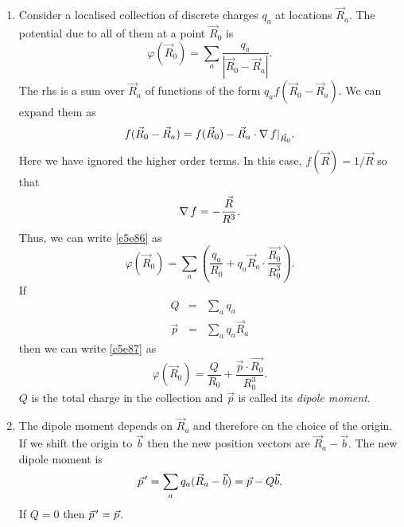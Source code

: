 \begin{enumerate}
\item Consider a localised collection of discrete charges $q_a$ at locations 
$\vec{R}_a$. The potential due to all of them at a point $\vec{R}_0$ is
\begin{equation}\label{c5e86}
\varphi(\vec{R}_0) = \sum_a\frac{q_a}{|\vec{R}_0 - \vec{R}_a|}.
\end{equation}
The rhs is a sum over $\vec{R}_a$ of functions of the form $q_af
(\vec{R}_0-\vec{R}_a)$.
We can expand them as
\[
f(\vec{R}_0-\vec{R}_a) = f(\vec{R}_0) - \vec{R}_a\cdot\operatorname{\nabla} f|_{\vec{R}_0}.
\]
Here we have ignored the higher order terms. In this case, $f(\vec{R}) = 
1/\vec{R}$ so that
\[
\operatorname{\nabla} f = -\frac{\vec{R}}{R^3}.
\]
Thus, we can write \eqref{c5e86} as
\begin{equation}\label{c5e87}
\varphi(\vec{R}_0) = 
\sum_a\left(\frac{q_a}{R_0} + q_a\vec{R}_a\cdot\frac{\vec{R_0}}{R_0^3}\right).
\end{equation}
If
\begin{eqnarray}
Q &=& \sum_a q_a \label{c5e88} \\
\vec{p} &=& \sum_a q_a\vec{R}_a \label{c5e89}
\end{eqnarray}
then we can write \eqref{c5e87} as
\begin{equation}\label{c5e90}
\varphi(\vec{R}_0) = \frac{Q}{R_0} + \frac{\vec{p}\cdot\vec{R_0}}{R_0^3}.
\end{equation}
$Q$ is the total charge in the collection and $\vec{p}$ is called its 
\emph{dipole moment}.

\item The dipole moment depends on $\vec{R}_a$ and therefore on the choice of 
the origin. If we shift the origin to $\vec{b}$ then the new position vectors 
are
$\vec{R}_a - \vec{b}$. The new dipole moment is
\begin{equation}\label{c5e91}
\vec{p}^{\,\prime} = \sum_a q_a (\vec{R}_a - \vec{b}) = \vec{p} - Q\vec{b}.
\end{equation}
If $Q = 0$ then $\vec{p}^{\,\prime} = \vec{p}$. 


\end{enumerate}
